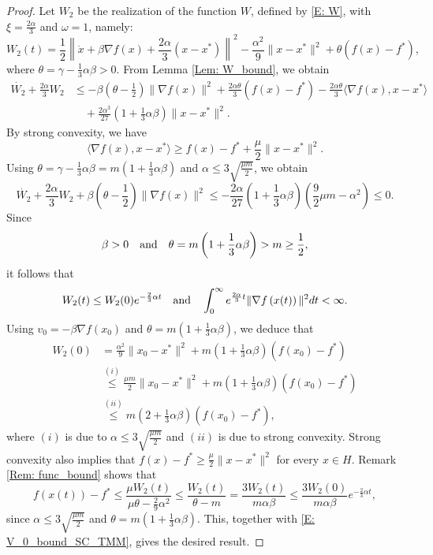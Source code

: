 \documentclass[pdflatex,sn-mathphys-num]{sn-jnl}
\theoremstyle{thmstyleone}
\theoremstyle{thmstyletwo}
\theoremstyle{thmstylethree}
\newcommand{\qbox}[1]{\quad\hbox{#1}\quad}
\begin{document}
\begin{proof}
Let $W_2$ be the realization of the function $W$, defined by \eqref{E: W}, with $\xi=\frac{2\alpha}{3}$ and $\omega=1$, namely:
$$W_2(t) = \frac{1}{2}\left\| \dot{x} + \beta\nabla f(x) + \frac{2\alpha}{3}(x-x^*) \right\|^2
  - \frac{\alpha^2}{9}\| x - x^* \|^2 + \theta\left( f(x) - f^* \right),$$
where $\theta=\gamma-\frac{1}{3}\alpha\beta>0$. From Lemma \ref{Lem: W_bound}, we obtain
\begin{align*}
\dot{W_2} + \frac{2\alpha}{3} W_2
&\le -\beta\left( \theta - \frac{1}{2} \right)\| \nabla f(x) \|^2 
   + \frac{2\alpha\theta}{3} \left( f(x) - f^* \right)
   - \frac{2\alpha\theta}{3} \langle \nabla f(x), x-x^* \rangle \\
&\quad + \frac{2\alpha^3}{27}\left( 1 + \frac{1}{3}\alpha\beta \right)\| x-x^* \|^2.
\end{align*}
By strong convexity, we have
$$ \langle\nabla f(x),x-x^* \rangle \ge f(x)-f^* + \frac{\mu}{2}\|x-x^*\|^2.$$
Using $\theta = \gamma - \frac{1}{3}\alpha\beta = m\left( 1 + \frac{1}{3}\alpha\beta \right)$ and $\alpha\le 3\sqrt{\frac{\mu m}{2}}$, we obtain
$$ \dot{W_2} + \frac{2\alpha}{3} W_2 + \beta\left( \theta - \frac{1}{2} \right)\| \nabla f(x) \|^2 
\le - \frac{2\alpha}{27}\left( 1 + \frac{1}{3}\alpha\beta \right)\left( \frac{9}{2}\mu m - \alpha^2 \right) \le 0. $$
Since
$$ \beta>0 \qbox{and} \theta = m\left( 1 + \frac{1}{3}\alpha\beta \right) > m \ge \frac{1}{2}, $$
it follows that
$$ W_2(t)\le W_2(0) e^{-\frac{2}{3}\alpha t} \qbox{and} \int_0^{\infty} e^{\frac{2\alpha}{3}t}\| \nabla f\left(x(t)\right) \|^2 dt < \infty. $$
Using $v_0 = -\beta\nabla f(x_0)$ and $\theta= m\left( 1 + \frac{1}{3}\alpha\beta \right)$, we deduce that
\begin{equation}\label{E: V_0_bound_SC_TMM}
\begin{aligned}
W_2(0) 
&= \frac{\alpha^2}{9}\| x_0 - x^* \|^2 + m\left( 1 + \frac{1}{3}\alpha\beta \right)\left( f(x_0) - f^* \right) \\
&\stackrel{(i)}{\le} \frac{\mu m}{2}\| x_0 - x^* \|^2 + m\left( 1 + \frac{1}{3}\alpha\beta \right)\left( f(x_0) - f^* \right) \\
&\stackrel{(ii)}{\le} m\left( 2 + \frac{1}{3}\alpha\beta \right)\left( f(x_0) - f^* \right),
\end{aligned}
\end{equation}
where $(i)$ is due to $\alpha\le 3\sqrt{\frac{\mu m}{2}}$ and $(ii)$ is due to strong convexity. Strong convexity also implies that $f(x) - f^*\ge \frac{\mu}{2}\|x-x^*\|^2$ for every $x\in H$. Remark \ref{Rem: func_bound} shows that 
$$ f\left(x(t) \right) - f^* 
\le \frac{\mu W_2(t)}{\mu\theta - \frac{2}{9}\alpha^2}
\le \frac{W_2(t)}{\theta-m}
= \frac{3W_2(t)}{m \alpha \beta}
\le \frac{3W_2(0)}{m\alpha\beta}e^{-\frac{2}{3}\alpha t}, $$
since $\alpha\le 3\sqrt{\frac{\mu m}{2}}$ and $\theta= m\left( 1 + \frac{1}{3}\alpha\beta \right)$. This, together with \eqref{E: V_0_bound_SC_TMM}, gives the desired result. 
\end{proof}
\end{document}
